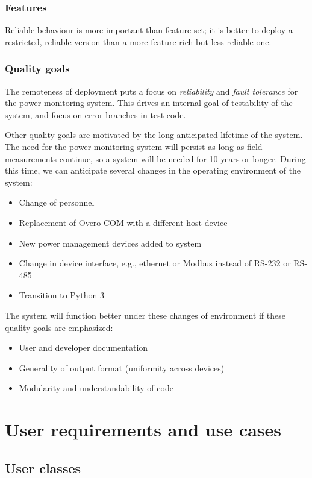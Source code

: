 \documentclass[pdftex,oneside,12pt,a4paper]{book}
\begin{document}
\subsection{Features}
Reliable behaviour is more important than feature set;  it is better to deploy a restricted, reliable version than a more feature-rich but less reliable one.

\subsection{Quality goals}
The remoteness of deployment puts a focus on \emph{reliability} and \emph{fault tolerance} for the power monitoring system.  This drives an internal goal of testability of the system, and focus on error branches in test code. 

Other quality goals are motivated by the long anticipated lifetime of the system.  The need for the power monitoring system will persist as long as field measurements continue, so a system will be needed for 10 years or longer.  During this time, we can anticipate several changes in the operating environment of the system:
\begin{itemize}
\item Change of personnel
\item Replacement of Overo COM with a different host device
\item New power management devices added to system
\item Change in device interface, e.g., ethernet or Modbus instead of RS-232 or RS-485
\item Transition to Python 3
\end{itemize}
The system will function better under these changes of environment if these quality goals are emphasized:
\begin{itemize}
\item User and developer documentation
\item Generality of output format (uniformity across devices)
\item Modularity and understandability of code
\end{itemize}

\chapter{User requirements and use cases}
\section{User classes}
\end{document}
